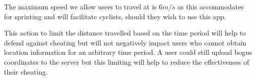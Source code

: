 The maximum speed we allow users to travel at is $\text{6}m/s$ as this
accommodates for sprinting and will facilitate cyclists, should they
wish to use this app.

This action to limit the distance travelled based on the time period
will help to defend against cheating but will not negatively impact
users who cannot obtain location information for an arbitrary time
period. A user could still upload bogus coordinates to the server but
this limiting will help to reduce the effectiveness of their
cheating.



